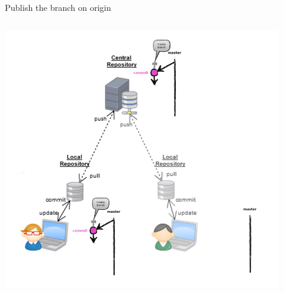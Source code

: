 \begin{frame}[fragile]{Publish the branch on origin}
\begin{columns}
\begin{column}{0.4\textwidth}
\begin{center}
{			}\only<3> {
				\includegraphics[width=0.9\textwidth]{multiuser_push_branch.png}
			}
		\end{center}
	\end{column}
\end{columns}
\end{frame}


